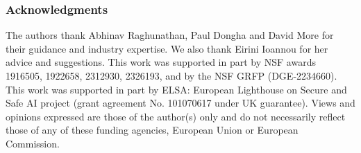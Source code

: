 \subsubsection*{Acknowledgments}
The authors thank Abhinav Raghunathan, Paul Dongha and David More for their guidance and industry expertise. We also thank Eirini Ioannou for her advice and suggestions. This work was supported in part by NSF awards 1916505, 1922658, 2312930, 2326193, and by the NSF GRFP (DGE-2234660).
This work was supported in part by ELSA: European Lighthouse on Secure and Safe AI project
(grant agreement No. 101070617 under UK guarantee). 
Views and opinions expressed are those of the author(s) only and do not necessarily reflect those of any of these funding agencies, European Union or European Commission.